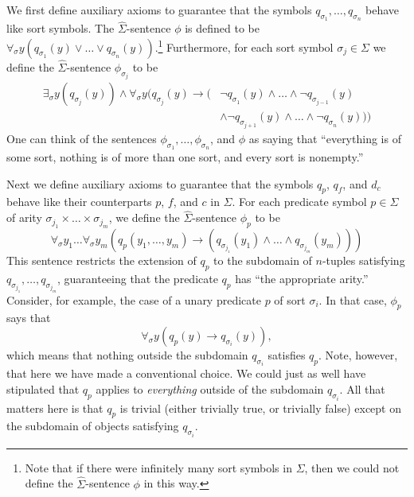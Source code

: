 We first define auxiliary axioms to guarantee that the symbols
$q_{\sigma_1},\ldots, q_{\sigma_n}$ behave like sort symbols. The
$\widehat{\Sigma}$-sentence $\phi$ is defined to be $\forall_\sigma
y(q_{\sigma_1}(y)\lor\ldots\lor q_{\sigma_n}(y))$.\footnote{Note that
  if there were infinitely many sort symbols in $\Sigma$, then we
  could not define the $\widehat{\Sigma}$-sentence $\phi$ in this
  way.} Furthermore, for each sort symbol $\sigma_j\in\Sigma$ we
define the $\widehat{\Sigma}$-sentence $\phi_{\sigma_j}$ to be
\begin{align*}
\exists_\sigma y (q_{\sigma_j}(y))\land\forall_\sigma y \big(q_{\sigma_j}(y)\rightarrow (&\lnot q_{\sigma_1}(y)\land\ldots\land \lnot q_{\sigma_{j-1}}(y)\\&\land \lnot q_{\sigma_{j+1}}(y)\land\ldots\land\lnot q_{\sigma_n}(y))\big)
\end{align*}
One can think of the sentences $\phi_{\sigma_1},\ldots, \phi_{\sigma_n}$, and $\phi$ as saying that ``everything is of some sort, nothing is of more than one sort, and every sort is nonempty.''

Next we define auxiliary axioms to guarantee that the symbols $q_p$,
$q_f$, and $d_c$ behave like their counterparts $p$, $f$, and $c$ in
$\Sigma$.  For each predicate symbol $p\in\Sigma$ of arity
$\sigma_{j_1}\times\ldots\times\sigma_{j_m}$, we define the
$\widehat{\Sigma}$-sentence $\phi_{p}$ to be
$$
\forall_\sigma y_1\ldots \forall_\sigma y_m\left(q_{p}(y_1,\ldots,
  y_m)\rightarrow \left(q_{\sigma_{j_1}}(y_1)\land \ldots\land
    q_{\sigma_{j_m}}(y_m)\right)\right)
$$
This sentence restricts the extension of $q_p$ to the subdomain of
$n$-tuples satisfying $q_{\sigma _{j_1}},\dots ,q_{\sigma _{j_m}}$,
guaranteeing that the predicate $q_p$ has ``the appropriate arity.''
Consider, for example, the case of a unary predicate $p$ of sort
$\sigma _i$.  In that case, $\phi _p$ says that
$$ \forall _\sigma y (q_p(y)\to q_{\sigma _i}(y)) ,$$
which means that nothing outside the subdomain $q_{\sigma _i}$
satisfies $q_p$.  Note, however, that here we have made a
conventional choice.  We could just as well have stipulated
that $q_p$ applies to \textit{everything} outside of the subdomain
$q_{\sigma _i}$.  All that matters here is that $q_p$ is trivial (either trivially true, or trivially false) except on the subdomain of objects satisfying $q_{\sigma _i}$.

